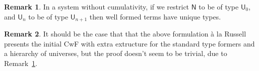 \documentclass[11pt,a4paper]{article}
\theoremstyle{definition}
\newtheorem{remark}{Remark}
\newcommand{\NN}{\mathsf{N}}
\newcommand{\UU}{\mathsf{U}}
\begin{document}
\begin{remark} \label{uniqueness:without:cumulativity}
  In a system without cumulativity, if we restrict $\NN$ to be of type $\UU_0$, and $\UU_n$ to be of type $\UU_{n+1}$ then well formed terms have unique types.
\end{remark}

\begin{remark}
  It should be the case that that the above formulation \`a la Russell presents the initial CwF with extra extructure for the standard type formers and a hierarchy of universes, but the proof doesn't seem to be trivial, due to Remark~\ref{uniqueness:without:cumulativity}.
\end{remark}
\end{document}
